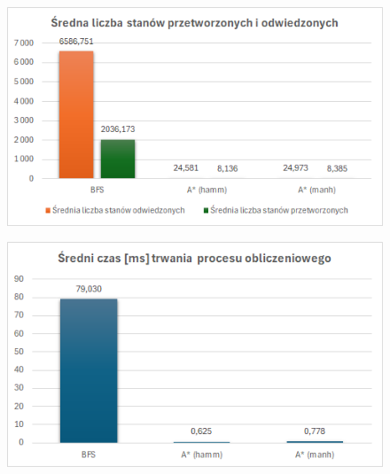 \documentclass{classrep}
\begin{document}
    \begin{figure}
        \centering
        \includegraphics[width=\textwidth,height=\textheight,keepaspectratio]{average-count-of-visited-without-dfs}
        \caption{}
        \label{fig:4}
    \end{figure}
    \begin{figure}
        \centering
        \includegraphics[width=\textwidth,height=\textheight,keepaspectratio]{average-time-without-dfs}
        \caption{}
        \label{fig:5}
    \end{figure}
\end{document}
